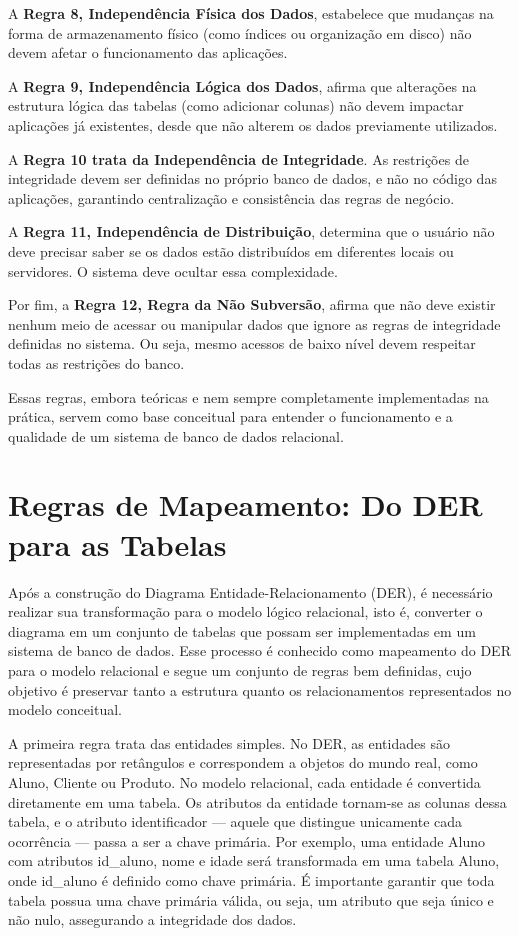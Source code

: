 A \textbf{Regra 8, Independência Física dos Dados}, estabelece que mudanças na forma de armazenamento físico (como índices ou organização em disco) não devem afetar o funcionamento das aplicações.

A \textbf{Regra 9, Independência Lógica dos Dados}, afirma que alterações na estrutura lógica das tabelas (como adicionar colunas) não devem impactar aplicações já existentes, desde que não alterem os dados previamente utilizados.

A \textbf{Regra 10 trata da Independência de Integridade}. As restrições de integridade devem ser definidas no próprio banco de dados, e não no código das aplicações, garantindo centralização e consistência das regras de negócio.

A \textbf{Regra 11, Independência de Distribuição}, determina que o usuário não deve precisar saber se os dados estão distribuídos em diferentes locais ou servidores. O sistema deve ocultar essa complexidade.

Por fim, a \textbf{Regra 12, Regra da Não Subversão}, afirma que não deve existir nenhum meio de acessar ou manipular dados que ignore as regras de integridade definidas no sistema. Ou seja, mesmo acessos de baixo nível devem respeitar todas as restrições do banco.

Essas regras, embora teóricas e nem sempre completamente implementadas na prática, servem como base conceitual para entender o funcionamento e a qualidade de um sistema de banco de dados relacional.
\section{Regras de Mapeamento: Do DER para as Tabelas}

Após a construção do Diagrama Entidade-Relacionamento (DER), é necessário realizar sua transformação para o modelo lógico relacional, isto é, converter o diagrama em um conjunto de tabelas que possam ser implementadas em um sistema de banco de dados. Esse processo é conhecido como mapeamento do DER para o modelo relacional e segue um conjunto de regras bem definidas, cujo objetivo é preservar tanto a estrutura quanto os relacionamentos representados no modelo conceitual.

A primeira regra trata das entidades simples. No DER, as entidades são representadas por retângulos e correspondem a objetos do mundo real, como Aluno, Cliente ou Produto. No modelo relacional, cada entidade é convertida diretamente em uma tabela. Os atributos da entidade tornam-se as colunas dessa tabela, e o atributo identificador — aquele que distingue unicamente cada ocorrência — passa a ser a chave primária. Por exemplo, uma entidade Aluno com atributos id\_aluno, nome e idade será transformada em uma tabela Aluno, onde id\_aluno é definido como chave primária. É importante garantir que toda tabela possua uma chave primária válida, ou seja, um atributo que seja único e não nulo, assegurando a integridade dos dados.

